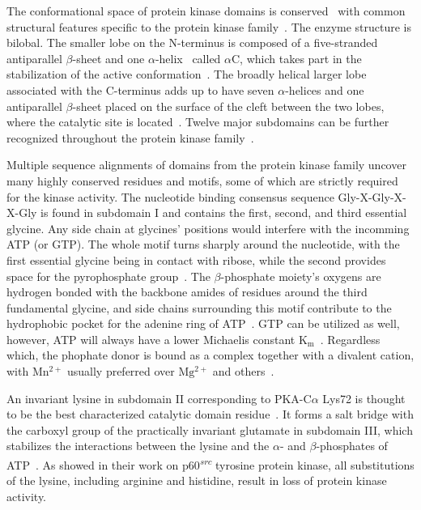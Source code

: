   The conformational space of protein kinase domains is conserved~\cite{ung2018redefining}
  with common structural features specific to the protein kinase
  family~\cite{taylor1994three}.
  The enzyme structure is bilobal.
  The smaller lobe on the N-terminus is composed of a five-stranded antiparallel
  $\beta$-sheet and one $\alpha$-helix~\cite{knighton1991crystal} called $\alpha$C, which
  takes part in the stabilization of the active
  conformation~\cite{mobitz2015abc, huse2002conformational}.
  The broadly helical larger lobe associated with the C-terminus adds up to have seven
  $\alpha$-helices and one antiparallel $\beta$-sheet placed on the surface of the cleft
  between the two lobes, where the catalytic site is
  located~\cite{knighton1991crystal, taylor1994three, azam2008activation}.
  Twelve major subdomains can be further recognized throughout the protein kinase
  family~\cite{hanks1988protein, hanks19912, hanks1995eukaryotic}.

  Multiple sequence alignments of domains from the protein kinase family uncover many
  highly conserved residues and motifs, some of which are strictly required for the kinase
  activity.
  The nucleotide binding consensus sequence Gly-X-Gly-X-X-Gly is found in subdomain I and
  contains the first, second, and third essential glycine.
  Any side chain at glycines' positions would interfere with the incomming ATP (or GTP).
  The whole motif turns sharply around the nucleotide, with the first essential glycine
  being in contact with ribose, while the second provides space for the pyrophosphate
  group~\cite{wierenga1983predicted, hanks1988protein}.
  The $\beta$-phosphate moiety's oxygens are hydrogen bonded with the backbone amides of
  residues around the third fundamental glycine, and side chains surrounding this motif
  contribute to the hydrophobic pocket for the adenine ring of
  ATP~\cite{hanks1995eukaryotic}.
  GTP can be utilized as well, however, ATP will always have a lower Michaelis constant
  $\mathrm{K_{m}}$~\cite{hunter1985protein}.
  Regardless which, the phophate donor is bound as a complex together with a divalent
  cation, with $\mathrm{Mn^{2+}}$ usually preferred over $\mathrm{Mg^{2+}}$ and
  others~\cite{witte1980abelson, richert1979characterization, wong1984purification}.

  An invariant lysine in subdomain II corresponding to PKA-C$\alpha$ Lys72 is thought to
  be the best characterized catalytic domain residue~\cite{hanks1988protein}.
  It forms a salt bridge with the carboxyl group of the practically invariant glutamate in
  subdomain III, which stabilizes the interactions between the lysine and the $\alpha$-
  and $\beta$-phosphates of ATP~\cite{hanks1995eukaryotic}.
  As \citet{kamps1986neither} showed in their work on p60\textsuperscript{\textit{src}}
  tyrosine protein kinase, all substitutions of the lysine, including arginine and
  histidine, result in loss of protein kinase activity.


